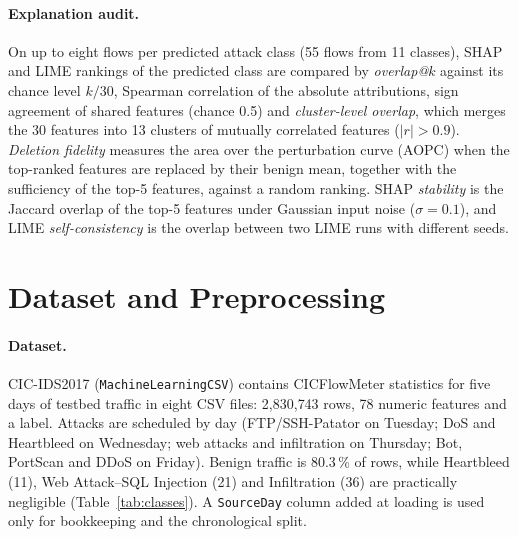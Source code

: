 \documentclass[11pt,a4paper]{article}
\begin{document}
\paragraph{Explanation audit.} On up to eight flows per predicted attack class (55 flows from 11 classes), SHAP and LIME rankings of the predicted class are compared by \emph{overlap@$k$} against its chance level $k/30$, Spearman correlation of the absolute attributions, sign agreement of shared features (chance 0.5) and \emph{cluster-level overlap}, which merges the 30 features into 13 clusters of mutually correlated features ($|r|>0.9$). \emph{Deletion fidelity} measures the area over the perturbation curve (AOPC) \parencite{samek2017} when the top-ranked features are replaced by their benign mean, together with the sufficiency of the top-5 features, against a random ranking. SHAP \emph{stability} is the Jaccard overlap of the top-5 features under Gaussian input noise ($\sigma=0.1$), and LIME \emph{self-consistency} is the overlap between two LIME runs with different seeds.

\section{Dataset and Preprocessing}
\label{sec:data}

\paragraph{Dataset.} CIC-IDS2017 \parencite{sharafaldin2018} (\texttt{MachineLearningCSV}) contains CICFlowMeter statistics for five days of testbed traffic in eight CSV files: 2{,}830{,}743 rows, 78 numeric features and a label. Attacks are scheduled by day (FTP/SSH-Patator on Tuesday; DoS and Heartbleed on Wednesday; web attacks and infiltration on Thursday; Bot, PortScan and DDoS on Friday). Benign traffic is 80.3\,\% of rows, while Heartbleed (11), Web Attack--SQL Injection (21) and Infiltration (36) are practically negligible (Table~\ref{tab:classes}). A \texttt{SourceDay} column added at loading is used only for bookkeeping and the chronological split.
\end{document}
